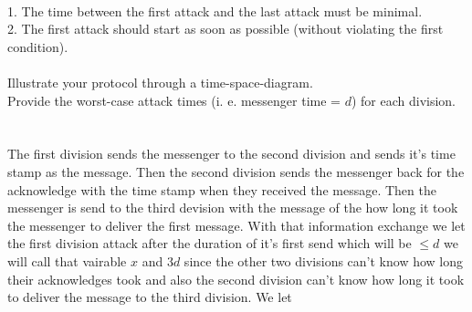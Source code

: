 \documentclass{article}
\begin{document}
\\
1. The time between the first attack and the last attack must be minimal.\\
2. The first attack should start as soon as possible (without violating the first condition).\\
\\
Illustrate your protocol through a time-space-diagram.\\
Provide the worst-case attack times (i. e. messenger time = $d$) for each division.\\
\\
\noindent{}\\
The first division sends the messenger to the second division and sends it's time stamp as the message.
Then the second division sends the messenger back for the acknowledge with the time stamp when they 
received the message. Then the messenger is send to the third devision with the message of the how long 
it took the messenger to deliver the first message. With that information exchange we let the first 
division attack after the duration of it's first send which will be $\leq d$ we will call 
that vairable $x$ and $3d$ since the other two divisions can't know how long their acknowledges took and 
also the second division can't know how long it took to deliver the message to the third division. We let 
\end{document}
